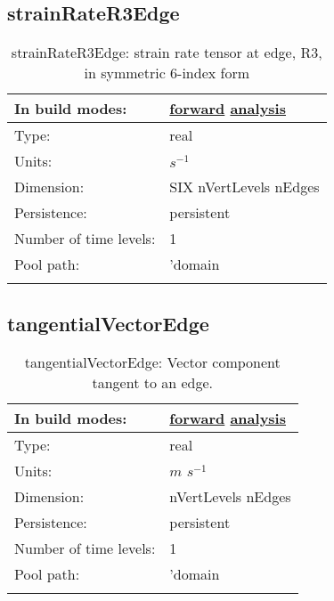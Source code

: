 \subsection[strainRateR3Edge]{strainRateR3Edge}
\label{subsec:var_sec_scratch_strainRateR3Edge}
\begin{center}
\begin{longtable}{| p{2.0in} | p{4.0in} |}
        \hline 
        In build modes: & \hyperref[subsec:forward_var_tab_scratch]{forward} \hyperref[subsec:analysis_var_tab_scratch]{analysis} \\
        \hline 
        Type: & real \\
        \hline 
        Units: & $s^{-1}$ \\
        \hline 
        Dimension: & SIX nVertLevels nEdges \\
        \hline 
        Persistence: & persistent \\
        \hline 
        Number of time levels: & 1 \\
        \hline 
            Pool path: & 'domain %
 \\
		 \hline 
    \caption{strainRateR3Edge: strain rate tensor at edge, R3, in symmetric 6-index form}
\end{longtable}
\end{center}
\subsection[tangentialVectorEdge]{tangentialVectorEdge}
\label{subsec:var_sec_scratch_tangentialVectorEdge}
\begin{center}
\begin{longtable}{| p{2.0in} | p{4.0in} |}
        \hline 
        In build modes: & \hyperref[subsec:forward_var_tab_scratch]{forward} \hyperref[subsec:analysis_var_tab_scratch]{analysis} \\
        \hline 
        Type: & real \\
        \hline 
        Units: & $m$ $s^{-1}$ \\
        \hline 
        Dimension: & nVertLevels nEdges \\
        \hline 
        Persistence: & persistent \\
        \hline 
        Number of time levels: & 1 \\
        \hline 
            Pool path: & 'domain %
 \\
		 \hline 
    \caption{tangentialVectorEdge: Vector component tangent to an edge.}
\end{longtable}
\end{center}
